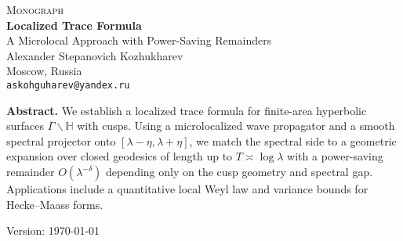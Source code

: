 \documentclass[11pt]{article}
\numberwithin{equation}{section}
\begin{document}
\begin{titlepage}
  \centering
  \vspace*{6mm}
  {\Large\scshape Monograph}\\[12mm]
  {\LARGE\bfseries Localized Trace Formula}\\[4mm]
  {\large A Microlocal Approach with Power-Saving Remainders}\\[16mm]

  {\large Alexander Stepanovich Kozhukharev}\\[2mm]
  Moscow, Russia\\[2mm]
  \texttt{askohguharev@yandex.ru}\\[14mm]

  \vfill

  \begin{tcolorbox}[colback=white,colframe=black!15,sharp corners,boxrule=0.3pt]
  \small
  \textbf{Abstract.}\;
  We establish a localized trace formula for finite-area hyperbolic surfaces
  $\Gamma\backslash\mathbb{H}$ with cusps. Using a microlocalized wave propagator
  and a smooth spectral projector onto $[\lambda-\eta,\lambda+\eta]$, we match the
  spectral side to a geometric expansion over closed geodesics of length up to
  $T\asymp\log\lambda$ with a power-saving remainder $O(\lambda^{-\delta})$
  depending only on the cusp geometry and spectral gap. Applications include a
  quantitative local Weyl law and variance bounds for Hecke--Maass forms.
  \end{tcolorbox}

  \vfill
  {\small Version: \today}
\end{titlepage}

\setcounter{page}{1}
















\appendix











\end{document}

